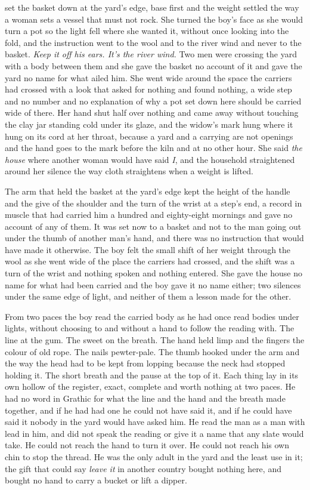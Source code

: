  set the basket down at the yard's edge, base first and the weight settled the way a woman sets a vessel that must not rock. She turned the boy's face as she would turn a pot so the light fell where she wanted it, without once looking into the fold, and the instruction went to the wool and to the river wind and never to the basket. \emph{Keep it off his ears. It's the river wind.} Two men were crossing the yard with a body between them and she gave the basket no account of it and gave the yard no name for what ailed him. She went wide around the space the carriers had crossed with a look that asked for nothing and found nothing, a wide step and no number and no explanation of why a pot set down here should be carried wide of there. Her hand shut half over nothing and came away without touching the clay jar standing cold under its glaze, and the widow's mark hung where it hung on its cord at her throat, because a yard and a carrying are not openings and the hand goes to the mark before the kiln and at no other hour. She said \emph{the house} where another woman would have said \emph{I}, and the household straightened around her silence the way cloth straightens when a weight is lifted.

The arm that held the basket at the yard's edge kept the height of the handle and the give of the shoulder and the turn of the wrist at a step's end, a record in muscle that had carried him a hundred and eighty-eight mornings and gave no account of any of them. It was set now to a basket and not to the man going out under the thumb of another man's hand, and there was no instruction that would have made it otherwise. The boy felt the small shift of her weight through the wool as she went wide of the place the carriers had crossed, and the shift was a turn of the wrist and nothing spoken and nothing entered. She gave the house no name for what had been carried and the boy gave it no name either; two silences under the same edge of light, and neither of them a lesson made for the other.

From two paces the boy read the carried body as he had once read bodies under lights, without choosing to and without a hand to follow the reading with. The line at the gum. The sweet on the breath. The hand held limp and the fingers the colour of old rope. The nails pewter-pale. The thumb hooked under the arm and the way the head had to be kept from lopping because the neck had stopped holding it. The short breath and the pause at the top of it. Each thing lay in its own hollow of the register, exact, complete and worth nothing at two paces. He had no word in Grathic for what the line and the hand and the breath made together, and if he had had one he could not have said it, and if he could have said it nobody in the yard would have asked him. He read the man as a man with lead in him, and did not speak the reading or give it a name that any slate would take. He could not reach the hand to turn it over. He could not reach his own chin to stop the thread. He was the only adult in the yard and the least use in it; the gift that could say \emph{leave it} in another country bought nothing here, and bought no hand to carry a bucket or lift a dipper.

